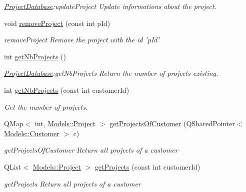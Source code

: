 \begin{DoxyCompactItemize}
\begin{DoxyCompactList}\small\item\em \hyperlink{classDatabases_1_1ProjectDatabase}{Project\-Database}\-:update\-Project Update informations about the project. \end{DoxyCompactList}\item 
void \hyperlink{classDatabases_1_1ProjectDatabase_abdd5fcb1913c2d2f375a658f6656c522}{remove\-Project} (const int p\-Id)
\begin{DoxyCompactList}\small\item\em remove\-Project Remove the project with the id 'p\-Id' \end{DoxyCompactList}\item 
int \hyperlink{classDatabases_1_1ProjectDatabase_aa486ad21f156a8ba7d08baef29e0aaea}{get\-Nb\-Projects} ()
\begin{DoxyCompactList}\small\item\em \hyperlink{classDatabases_1_1ProjectDatabase}{Project\-Database}\-:get\-Nb\-Projects Return the number of projects existing. \end{DoxyCompactList}\item 
int \hyperlink{classDatabases_1_1ProjectDatabase_a62db108febd50cdc2dc2b686cf954da6}{get\-Nb\-Projects} (const int customer\-Id)
\begin{DoxyCompactList}\small\item\em Get the number of projects. \end{DoxyCompactList}\item 
Q\-Map$<$ int, \hyperlink{classModels_1_1Project}{Models\-::\-Project} $>$ \hyperlink{classDatabases_1_1ProjectDatabase_acf044f95bd4df4e04bff9ef52d326704}{get\-Projects\-Of\-Customer} (Q\-Shared\-Pointer$<$ \hyperlink{classModels_1_1Customer}{Models\-::\-Customer} $>$ c)
\begin{DoxyCompactList}\small\item\em get\-Projects\-Of\-Customer Return all projects of a customer \end{DoxyCompactList}\item 
Q\-List$<$ \hyperlink{classModels_1_1Project}{Models\-::\-Project} $>$ \hyperlink{classDatabases_1_1ProjectDatabase_a75963715e3cae349fe3aa555f7226c56}{get\-Projects} (const int customer\-Id)
\begin{DoxyCompactList}\small\item\em get\-Projects Return all projects of a customer \end{DoxyCompactList}\item 

\end{DoxyCompactItemize}
